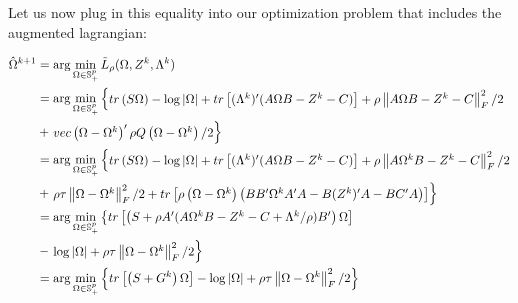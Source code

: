 \documentclass[11pt,]{report}
\theoremstyle{definition}
\theoremstyle{definition}
\theoremstyle{definition}
\theoremstyle{remark}
\begin{document}
Let us now plug in this equality into our optimization problem that includes the augmented lagrangian:

\begin{equation}
\begin{split}
  \hat{\Omega}^{k + 1} &= \arg\min_{\Omega \in \mathbb{S}_{+}^{p}}\tilde{L}_{\rho}(\Omega, Z^{k}, \Lambda^{k}) \\
  &= \arg\min_{\Omega \in \mathbb{S}_{+}^{p}}\left\{\begin{matrix}
 tr\left(S\Omega\right) - \log\left|\Omega\right| + tr\left[(\Lambda^{k})'(A\Omega B - Z^{k} - C) \right] + \rho\left\|A\Omega B - Z^{k} - C \right\|_{F}^{2}/2 \end{matrix}\right. \\
  &+ \left.\begin{matrix} vec\left(\Omega - \Omega^{k}\right)'\rho Q\left(\Omega - \Omega^{k}\right)/2 \end{matrix}\right\} \\
  &= \arg\min_{\Omega \in \mathbb{S}_{+}^{p}}\left\{\begin{matrix}
 tr\left(S\Omega\right) - \log\left|\Omega\right| + tr\left[(\Lambda^{k})'(A\Omega B - Z^{k} - C) \right] + \rho\left\|A\Omega^{k} B - Z^{k} - C \right\|_{F}^{2}/2 \end{matrix}\right. \\
  &+ \left.\begin{matrix} \rho\tau\left\|\Omega - \Omega^{k}\right\|_{F}^{2}/2 + tr\left[\rho\left(\Omega - \Omega^{k}\right)\left(BB'\Omega^{k}A'A - B(Z^{k})'A - BC'A \right)\right] \end{matrix}\right\} \\
  &= \arg\min_{\Omega \in \mathbb{S}_{+}^{p}}\left\{\begin{matrix}
 tr\left[\left(S + \rho A'(A\Omega^{k}B - Z^{k} - C + \Lambda^{k}/\rho)B' \right)\Omega\right] \end{matrix}\right. \\
  &- \left.\begin{matrix} \log\left|\Omega\right| + \rho\tau\left\|\Omega - \Omega^{k}\right\|_{F}^{2}/2 \end{matrix}\right\} \\
  &= \arg\min_{\Omega \in \mathbb{S}_{+}^{p}}\left\{
 tr\left[\left(S + G^{k} \right)\Omega\right] - \log\left|\Omega\right| + \rho\tau\left\|\Omega - \Omega^{k}\right\|_{F}^{2}/2 \right\} \\
\end{split}
\label{eq:omegaapprox}\notag
\end{equation}
\end{document}
